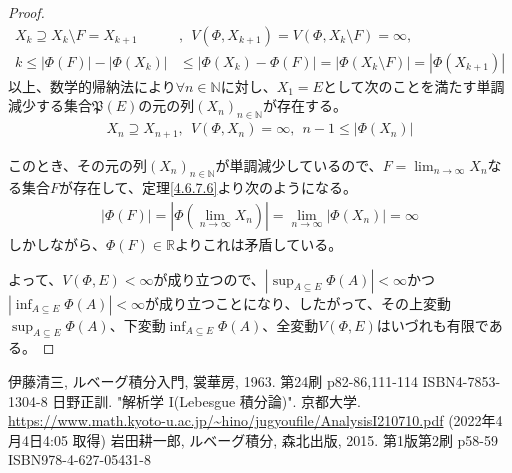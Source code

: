 \documentclass[dvipdfmx]{jsarticle}
\begin{document}
\begin{proof}
\begin{align*}
X_{k} \supseteq X_{k} \setminus F = X_{k + 1}&,\ \ V\left( \varPhi,X_{k + 1} \right) = V\left( \varPhi,X_{k} \setminus F \right) = \infty,\\
k \leq \left| \varPhi(F) \right| - \left| \varPhi\left( X_{k} \right) \right| &\leq \left| \varPhi\left( X_{k} \right) - \varPhi(F) \right| = \left| \varPhi\left( X_{k} \setminus F \right) \right| = \left| \varPhi\left( X_{k + 1} \right) \right|
\end{align*}
以上、数学的帰納法により$\forall n \in \mathbb{N}$に対し、$X_{1} = E$として次のことを満たす単調減少する集合$\mathfrak{P}(E)$の元の列$\left( X_{n} \right)_{n \in \mathbb{N}}$が存在する。
\begin{align*}
X_{n} \supseteq X_{n + 1},\ \ V\left( \varPhi,X_{n} \right) = \infty,\ \ n - 1 \leq \left| \varPhi\left( X_{n} \right) \right|
\end{align*}\par
このとき、その元の列$\left( X_{n} \right)_{n \in \mathbb{N}}$が単調減少しているので、$F = \lim_{n \rightarrow \infty}X_{n}$なる集合$F$が存在して、定理\ref{4.6.7.6}より次のようになる。
\begin{align*}
\left| \varPhi(F) \right| = \left| \varPhi\left( \lim_{n \rightarrow \infty}X_{n} \right) \right| = \lim_{n \rightarrow \infty}\left| \varPhi\left( X_{n} \right) \right| = \infty
\end{align*}
しかしながら、$\varPhi(F) \in \mathbb{R}$よりこれは矛盾している。\par
よって、$V(\varPhi,E) < \infty$が成り立つので、$\left| \sup_{A \subseteq E}{\varPhi(A)} \right| < \infty$かつ$\left| \inf_{A \subseteq E}{\varPhi(A)} \right| < \infty$が成り立つことになり、したがって、その上変動$\sup_{A \subseteq E}{\varPhi(A)}$、下変動$\inf_{A \subseteq E}{\varPhi(A)}$、全変動$V(\varPhi,E)$はいづれも有限である。
\end{proof}
\begin{thebibliography}{50}
  伊藤清三, ルベーグ積分入門, 裳華房, 1963. 第24刷 p82-86,111-114 ISBN4-7853-1304-8
  日野正訓. "解析学 I(Lebesgue 積分論)". 京都大学. \url{https://www.math.kyoto-u.ac.jp/~hino/jugyoufile/AnalysisI210710.pdf} (2022年4月4日4:05 取得)
  岩田耕一郎, ルベーグ積分, 森北出版, 2015. 第1版第2刷 p58-59 ISBN978-4-627-05431-8
\end{thebibliography}
\end{document}

